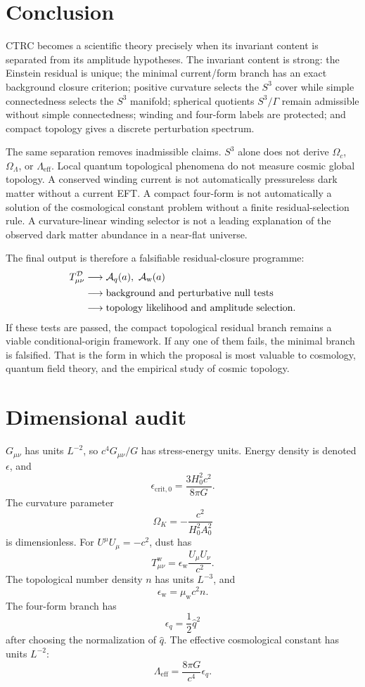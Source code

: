 \documentclass[
  aps,
  prd,
  reprint,
  superscriptaddress,
  floatfix,
  nofootinbib,
  longbibliography
]{revtex4-2}
\theoremstyle{plain}
\theoremstyle{definition}
\theoremstyle{remark}
\newcommand{\D}{\mathcal D}
\newcommand{\w}{\mathrm w}
\newcommand{\eff}{\mathrm{eff}}
\newcommand{\crit}{\mathrm{crit}}
\newcommand{\Aq}{\mathcal A_q}
\newcommand{\Aw}{\mathcal A_{\mathrm w}}
\newcommand{\eps}{\epsilon}
\newcommand{\qhat}{\widehat q}
\begin{document}
\section{Conclusion}

CTRC becomes a scientific theory precisely when its invariant content is separated from its amplitude hypotheses.  The invariant content is strong: the Einstein residual is unique; the minimal current/form branch has an exact background closure criterion; positive curvature selects the \(S^3\) cover while simple connectedness selects the \(S^3\) manifold; spherical quotients \(S^3/\Gamma\) remain admissible without simple connectedness; winding and four-form labels are protected; and compact topology gives a discrete perturbation spectrum.

The same separation removes inadmissible claims.  \(S^3\) alone does not derive \(\Omega_c\), \(\Omega_\Lambda\), or \(\Lambda_{\eff}\).  Local quantum topological phenomena do not measure cosmic global topology.  A conserved winding current is not automatically pressureless dark matter without a current EFT.  A compact four-form is not automatically a solution of the cosmological constant problem without a finite residual-selection rule.  A curvature-linear winding selector is not a leading explanation of the observed dark matter abundance in a near-flat universe.

The final output is therefore a falsifiable residual-closure programme:
\[
\begin{aligned}
T^\D_{\mu\nu}
&\longrightarrow
\Aq(a),\ \Aw(a)\\
&\longrightarrow
\hbox{background and perturbative null tests}\\
&\longrightarrow
\hbox{topology likelihood and amplitude selection}.
\end{aligned}
\]
If these tests are passed, the compact topological residual branch remains a viable conditional-origin framework.  If any one of them fails, the minimal branch is falsified.  That is the form in which the proposal is most valuable to cosmology, quantum field theory, and the empirical study of cosmic topology.

\appendix

\section{Dimensional audit}

\(G_{\mu\nu}\) has units \(L^{-2}\), so \(c^4G_{\mu\nu}/G\) has stress-energy units.  Energy density is denoted \(\eps\), and
\[
\eps_{\crit,0}=\frac{3H_0^2c^2}{8\pi G}.
\]
The curvature parameter
\[
\Omega_K=-\frac{c^2}{H_0^2A_0^2}
\]
is dimensionless.  For \(U^\mu U_\mu=-c^2\), dust has
\[
T^{\w}_{\mu\nu}=\eps_{\w}\frac{U_\mu U_\nu}{c^2}.
\]
The topological number density \(n\) has units \(L^{-3}\), and
\[
\eps_{\w}=\mu_{\w}c^2n .
\]
The four-form branch has
\[
\eps_q=\frac12\qhat^2
\]
after choosing the normalization of \(\qhat\).  The effective cosmological constant has units \(L^{-2}\):
\[
\Lambda_{\eff}=\frac{8\pi G}{c^4}\eps_q .
\]
\end{document}
